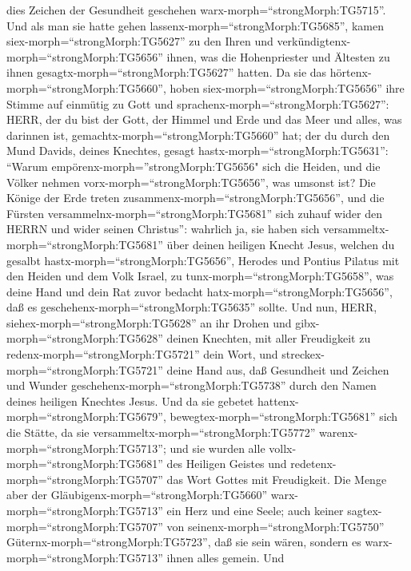 dies Zeichen der Gesundheit geschehen warx-morph=``strongMorph:TG5715''.
 Und als man sie hatte gehen
lassenx-morph=``strongMorph:TG5685'', kamen
siex-morph=``strongMorph:TG5627'' zu den Ihren und
verkündigtenx-morph=``strongMorph:TG5656'' ihnen, was die Hohenpriester
und Ältesten zu ihnen gesagtx-morph=``strongMorph:TG5627'' hatten.
 Da sie das hörtenx-morph=``strongMorph:TG5660'', hoben
siex-morph=``strongMorph:TG5656'' ihre Stimme auf einmütig zu Gott und
sprachenx-morph=``strongMorph:TG5627'': HERR, der du bist der Gott, der
Himmel und Erde und das Meer und alles, was darinnen ist,
gemachtx-morph=``strongMorph:TG5660'' hat;  der du durch
den Mund Davids, deines Knechtes, gesagt
hastx-morph=``strongMorph:TG5631'': ``Warum
empörenx-morph=''strongMorph:TG5656" sich die Heiden, und die Völker
nehmen vorx-morph=``strongMorph:TG5656'', was umsonst ist? 
Die Könige der Erde treten zusammenx-morph=``strongMorph:TG5656'', und
die Fürsten versammelnx-morph=``strongMorph:TG5681'' sich zuhauf wider
den HERRN und wider seinen Christus'':  wahrlich ja, sie
haben sich versammeltx-morph=``strongMorph:TG5681'' über deinen heiligen
Knecht Jesus, welchen du gesalbt hastx-morph=``strongMorph:TG5656'',
Herodes und Pontius Pilatus mit den Heiden und dem Volk Israel,
 zu tunx-morph=``strongMorph:TG5658'', was deine Hand und
dein Rat zuvor bedacht hatx-morph=``strongMorph:TG5656'', daß es
geschehenx-morph=``strongMorph:TG5635'' sollte.  Und nun,
HERR, siehex-morph=``strongMorph:TG5628'' an ihr Drohen und
gibx-morph=``strongMorph:TG5628'' deinen Knechten, mit aller Freudigkeit
zu redenx-morph=``strongMorph:TG5721'' dein Wort,  und
streckex-morph=``strongMorph:TG5721'' deine Hand aus, daß Gesundheit und
Zeichen und Wunder geschehenx-morph=``strongMorph:TG5738'' durch den
Namen deines heiligen Knechtes Jesus.  Und da sie gebetet
hattenx-morph=``strongMorph:TG5679'',
bewegtex-morph=``strongMorph:TG5681'' sich die Stätte, da sie
versammeltx-morph=``strongMorph:TG5772''
warenx-morph=``strongMorph:TG5713''; und sie wurden alle
vollx-morph=``strongMorph:TG5681'' des Heiligen Geistes und
redetenx-morph=``strongMorph:TG5707'' das Wort Gottes mit Freudigkeit.
 Die Menge aber der Gläubigenx-morph=``strongMorph:TG5660''
warx-morph=``strongMorph:TG5713'' ein Herz und eine Seele; auch keiner
sagtex-morph=``strongMorph:TG5707'' von
seinenx-morph=``strongMorph:TG5750''
Güternx-morph=``strongMorph:TG5723'', daß sie sein wären, sondern es
warx-morph=``strongMorph:TG5713'' ihnen alles gemein.  Und
